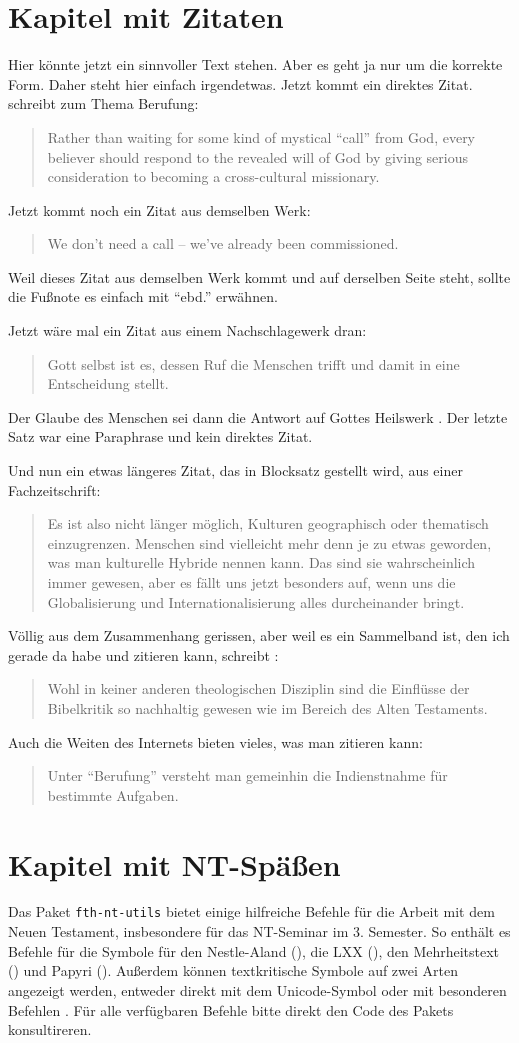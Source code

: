 \documentclass{scrreport}
\begin{document}
\chapter{Kapitel mit Zitaten}
Hier könnte jetzt ein sinnvoller Text stehen. Aber es geht ja nur um die korrekte Form. Daher steht hier einfach irgendetwas. Jetzt kommt ein direktes Zitat. \citeauthor*{friesen} schreibt zum Thema Berufung: \blockcquote[][330]{friesen}{Rather than waiting for some kind of mystical \enquote{call} from God, every believer should respond to the revealed will of God by giving serious consideration to becoming a cross-cultural missionary.} Jetzt kommt noch ein Zitat aus demselben Werk: \blockcquote[][330]{friesen}{We don't need a call -- we've already been commissioned.} Weil dieses Zitat aus demselben Werk kommt und auf derselben Seite steht, sollte die Fußnote es einfach mit \enquote{ebd.} erwähnen.

Jetzt wäre mal ein Zitat aus einem Nachschlagewerk dran: \blockcquote[][80]{rienecker}{Gott selbst ist es, dessen Ruf die Menschen trifft und damit in eine Entscheidung stellt.} Der Glaube des Menschen sei dann die Antwort auf Gottes Heilswerk \autocite[Vgl.][]{rienecker}. Der letzte Satz war eine Paraphrase und kein direktes Zitat.

Und nun ein etwas längeres Zitat, das in Blocksatz gestellt wird, aus einer Fachzeitschrift: \blockcquote[][]{dahl}{Es ist also nicht länger möglich, Kulturen geographisch oder thematisch einzugrenzen. Menschen sind vielleicht mehr denn je zu etwas geworden, was man kulturelle Hybride nennen kann. Das sind sie wahrscheinlich immer gewesen, aber es fällt uns jetzt besonders auf, wenn uns die Globalisierung und Internationalisierung alles durch\-einander bringt.}

Völlig aus dem Zusammenhang gerissen, aber weil es ein Sammelband ist, den ich gerade da habe und zitieren kann, schreibt \citeauthor*{hilbrands}: \blockcquote[][49]{hilbrands}{Wohl in keiner anderen theologischen Disziplin sind die Einflüsse der Bibelkritik so nachhaltig gewesen wie im Bereich des Alten Testaments.}

Auch die Weiten des Internets bieten vieles, was man zitieren kann: \blockcquote[][]{strecker}{Unter \enquote{Berufung} versteht man gemeinhin die \textelp{} Indienstnahme für bestimmte Aufgaben.}

\chapter{Kapitel mit NT-Späßen}
Das Paket \texttt{fth-nt-utils} bietet einige hilfreiche Befehle für die Arbeit mit dem Neuen Testament, insbesondere für das NT-Seminar im 3. Semester. So enthält es Befehle für die Symbole für den Nestle-Aland (\na), die LXX (\lxx), den Mehrheitstext (\majoritytext) und Papyri (). Außerdem können textkritische Symbole auf zwei Arten angezeigt werden, entweder direkt mit dem Unicode-Symbol  oder mit besonderen Befehlen \tcOmissionStart{} \tcOmissionEnd. Für alle verfügbaren Befehle bitte direkt den Code des Pakets konsultireren.
\end{document}
